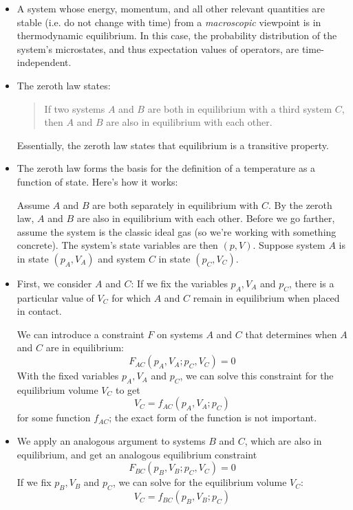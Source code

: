 \documentclass[11pt, a4paper]{article}
\begin{document}
\begin{itemize}
	\item A system whose energy, momentum, and all other relevant quantities are stable (i.e. do not change with time) from a \textit{macroscopic} viewpoint is in thermodynamic equilibrium. In this case, the probability distribution of the system's microstates, and thus expectation values of operators, are time-independent. 

	\item The zeroth law states:
	\begin{quote}
		If two systems $ A $ and $ B $ are both in equilibrium with a third system $ C $, then $ A $ and $ B $ are also in equilibrium with each other.
	\end{quote}
	Essentially, the zeroth law states that equilibrium is a transitive property.
	
	\item  The zeroth law forms the basis for the definition of a temperature as a function of state. Here's how it works:
	
	Assume $ A $ and $ B $ are both separately in equilibrium with $ C $. By the zeroth law, $ A $ and $ B $ are also in equilibrium with each other. Before we go farther, assume the system is the classic ideal gas (so we're working with something concrete). The system's state variables are then $ (p, V) $. Suppose system $ A $ is in state $ (p_{A}, V_{A}) $ and system $ C $ in state $ (p_{C}, V_{C}) $.
	
	\item First, we consider $ A $ and $ C $: If we fix the variables $ p_{A}, V_{A} $ and $ p_{C} $, there is a particular value of $ V_{C} $ for which $ A $ and $ C $ remain in equilibrium when placed in contact.
	
	We can introduce a constraint $ F $ on systems $ A $ and $ C $ that determines when $ A $ and $ C $ are in equilibrium:
	\begin{equation*}
		F_{AC}(p_{A}, V_{A}; p_{C}, V_{C}) = 0
	\end{equation*}
	With the fixed variables $ p_{A}, V_{A} $ and $ p_{C} $, we can solve this constraint for the equilibrium volume $ V_{C} $ to get
	\begin{equation*}
		V_{C} = f_{AC}(p_{A}, V_{A}; p_{C})
	\end{equation*} 
	for some function $ f_{AC} $; the exact form of the function is not important.
	
	\item We apply an analogous argument to systems $ B $ and $ C $, which are also in equilibrium, and get an analogous equilibrium constraint
	\begin{equation*}
		F_{BC}(p_{B}, V_{B}; p_{C}, V_{C}) = 0
	\end{equation*}
	If we fix $ p_{B}, V_{B} $ and $ p_{C} $, we can solve for the equilibrium volume $ V_{C} $:
	\begin{equation*}
		V_{C} = f_{BC}(p_{B}, V_{B}; p_{C})
	\end{equation*}
	

\end{itemize}
\end{document}
